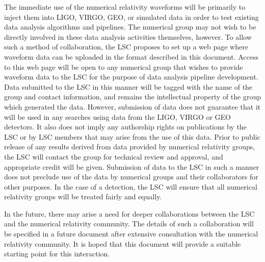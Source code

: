 \documentclass[10pt]{ligodcc}
\begin{document}
The immediate use of the numerical relativity waveforms will be
primarily to inject them into LIGO, VIRGO, GEO, or simulated data in
order to test existing data analysis algorithms and pipelines.  The
numerical group may not wish to be directly involved in these data
analysis activities themselves, however. To allow such a method of
collaboration, the LSC proposes to set up a web page where waveform
data can be uploaded in the format described in this document. Access
to this web page will be open to any numerical group that wishes to
provide waveform data to the LSC for the purpose of data analysis
pipeline development. Data submitted to the LSC in this manner will be
tagged with the name of the group and contact information, and remains
the intellectual property of the group which generated the data.
However, submission of data does not guarantee that it will be used in
any searches using data from the LIGO, VIRGO or GEO detectors.  It
also does not imply any authorship rights on publications by the LSC
or by LSC members that may arise from the use of this data.  Prior to
public release of any results derived from data provided by numerical
relativity groups, the LSC will contact the group for technical review
and approval, and appropriate credit will be given.  Submission of
data to the LSC in such a manner does not preclude use of the data by
numerical groups and their collaborators for other purposes.  In the
case of a detection, the LSC will ensure that all numerical relativity
groups will be treated fairly and equally.

In the future, there may arise a need for deeper collaborations
between the LSC and the numerical relativity community.  The details
of such a collaboration will be specified in a future document after
extensive consultation with the numerical relativity community.  It is
hoped that this document will provide a suitable starting point for this
interaction.  




\end{document}
